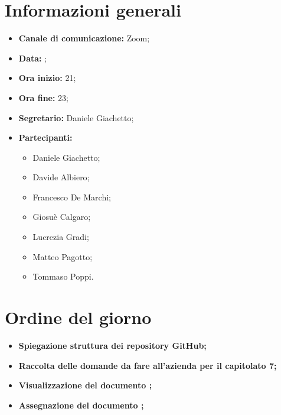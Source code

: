 \section{Informazioni generali}

\begin{itemize}

	\item \textbf{Canale di comunicazione:} Zoom;
	
	\item \textbf{Data:} \DataMeeting{};
	
	\item \textbf{Ora inizio:} 21;
	
	\item \textbf{Ora fine:} 23;
	
	\item \textbf{Segretario:} Daniele Giachetto;
	
	\item \textbf{Partecipanti:}
	
		\begin{itemize}
		
			\item Daniele Giachetto;
			\item Davide Albiero;
			\item Francesco De Marchi;
			\item Giosuè Calgaro;
			\item Lucrezia Gradi;
			\item Matteo Pagotto;
			\item Tommaso Poppi.
				 
		\end{itemize}

\end{itemize}

\section{Ordine del giorno}

\begin{itemize}

	\item\textbf{Spiegazione struttura dei repository GitHub;}

	\item\textbf{Raccolta delle domande da fare all'azienda per il capitolato 7;}

	\item\textbf{Visualizzazione del documento \SdF{};}
	
	\item\textbf{Assegnazione del documento \PdP{};}

\end{itemize}

